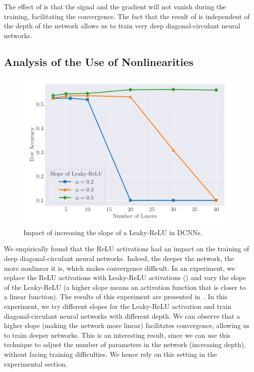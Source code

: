 The effect of  is that the signal and the gradient will not vanish during the training, facilitating the convergence.
The fact that the result of  is independent of the depth of the network allows us to train very deep diagonal-circulant neural networks.



\subsection{Analysis of the Use of Nonlinearities}
\label{subsection:ch4-analysis_on_the_use_of_nonlinearities}

\begin{figure}[htb]
  \centering
  \includegraphics[width=\scalefigure\textwidth]{figures/main/ch4-diagonal_circulant/cifar10_leaky_relu.pdf}
  \caption{Impact of increasing the slope of a Leaky-ReLU in DCNNs.}
  \label{figure:ch4-cifar10_leaky_relu}
\end{figure}


We empirically found that the ReLU activations had an impact on the training of deep diagonal-circulant neural networks.
Indeed, the deeper the network, the more nonlinear it is, which makes convergence difficult.
In an experiment, we replace the ReLU activations with Leaky-ReLU activations (\cf {}) and vary the slope of the Leaky-ReLU (a higher slope means an activation function that is closer to a linear function).
The results of this experiment are presented in~.
In this experiment, we try different slopes for the Leaky-ReLU activation and train diagonal-circulant neural networks with different depth.
We can observe that a higher slope (making the network more linear) facilitates convergence, allowing us to train deeper networks.
This is an interesting result, since  we can use this technique to adjust the number of parameters in the network (increasing depth), without facing training difficulties.
We hence rely on this setting in the experimental section. 


